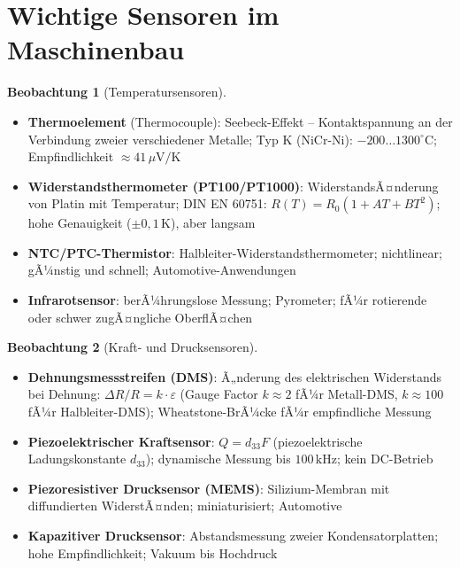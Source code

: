﻿\documentclass[a4paper,12pt]{report}
\theoremstyle{definition}
\newtheorem{beobachtung}{Beobachtung}
\begin{document}
\section{Wichtige Sensoren im Maschinenbau}

\begin{beobachtung}[Temperatursensoren]
\begin{itemize}
    \item[-] \textbf{Thermoelement} (Thermocouple): Seebeck-Effekt -- Kontaktspannung
          an der Verbindung zweier verschiedener Metalle; Typ K (NiCr-Ni):
          $-200\ldots1300^\circ\mathrm{C}$; Empfindlichkeit $\approx 41\,\mu\mathrm{V/K}$
    \item[-] \textbf{Widerstandsthermometer (PT100/PT1000)}: WiderstandsÃ¤nderung
          von Platin mit Temperatur; DIN EN 60751: $R(T) = R_0(1 + A T + B T^2)$;
          hohe Genauigkeit ($\pm 0{,}1\,\mathrm{K}$), aber langsam
    \item[-] \textbf{NTC/PTC-Thermistor}: Halbleiter-Widerstandsthermometer;
          nichtlinear; gÃ¼nstig und schnell; Automotive-Anwendungen
    \item[-] \textbf{Infrarotsensor}: berÃ¼hrungslose Messung; Pyrometer;
          fÃ¼r rotierende oder schwer zugÃ¤ngliche OberflÃ¤chen
\end{itemize}
\end{beobachtung}

\begin{beobachtung}[Kraft- und Drucksensoren]
\begin{itemize}
    \item[-] \textbf{Dehnungsmessstreifen (DMS)}: Ã„nderung des elektrischen
          Widerstands bei Dehnung: $\Delta R / R = k \cdot \varepsilon$
          (Gauge Factor $k \approx 2$ fÃ¼r Metall-DMS, $k \approx 100$ fÃ¼r Halbleiter-DMS);
          Wheatstone-BrÃ¼cke fÃ¼r empfindliche Messung
    \item[-] \textbf{Piezoelektrischer Kraftsensor}: $Q = d_{33} F$
          (piezoelektrische Ladungskonstante $d_{33}$);
          dynamische Messung bis $100\,\mathrm{kHz}$; kein DC-Betrieb
    \item[-] \textbf{Piezoresistiver Drucksensor (MEMS)}: Silizium-Membran
          mit diffundierten WiderstÃ¤nden; miniaturisiert; Automotive
    \item[-] \textbf{Kapazitiver Drucksensor}: Abstandsmessung zweier
          Kondensatorplatten; hohe Empfindlichkeit; Vakuum bis Hochdruck
\end{itemize}
\end{beobachtung}
\end{document}
